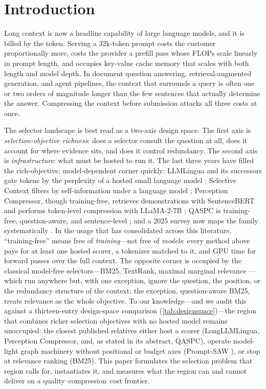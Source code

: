 \documentclass[preprint,12pt]{elsarticle}
\theoremstyle{remark}
\begin{document}
\section{Introduction}
\label{sec:intro}

Long context is now a headline capability of large language models, and
it is billed by the token. Serving a 32k-token prompt costs the customer
proportionally more, costs the provider a prefill pass whose FLOPs scale
linearly in prompt length, and occupies key-value cache memory that
scales with both length and model depth. In document question
answering, retrieval-augmented generation, and agent pipelines, the
context that surrounds a query is often one or two orders of magnitude
longer than the few sentences that actually determine the answer.
Compressing the context before submission attacks all three costs at
once.

The selector landscape is best read as a two-axis design space. The
first axis is \emph{selection-objective richness}: does a selector
consult the question at all, does it account for where evidence sits,
and does it control redundancy. The second axis is
\emph{infrastructure}: what must be hosted to run it. The last three
years have filled the rich-objective, model-dependent corner quickly:
LLMLingua and its successors gate tokens by the perplexity of a hosted
small language model
\citep{jiang2023llmlingua,jiang2023longllmlingua,pan2024llmlingua2};
Selective Context filters by self-information under a language model
\citep{li2023selective}; Perception Compressor, though training-free,
retrieves demonstrations with SentenceBERT and performs token-level
compression with LLaMA-2-7B \citep{tang2025perception}; QASPC is
training-free, question-aware, and sentence-level \citep{chen2025qaspc};
and a 2025 survey now maps the family systematically
\citep{li2025survey}. In the usage that has consolidated across this
literature, ``training-free'' means free of \emph{training}---not free
of \emph{models}: every method above pays for at least one hosted
scorer, a tokenizer matched to it, and GPU time for forward passes over
the full context. The opposite corner is occupied by the classical
model-free selectors---BM25, TextRank, maximal marginal relevance
\citep{robertson2009bm25,mihalcea2004textrank,carbonell1998mmr}---which
run anywhere but, with one exception, ignore the question, the
position, or the redundancy structure of the context; the exception,
question-aware BM25, treats relevance as the whole objective. To our
knowledge---and we audit this against a thirteen-entry design-space
comparison (\autoref{tab:designspace})---the region that combines richer
selection objectives with no hosted model remains unoccupied: the
closest published relatives either host a scorer (LongLLMLingua,
Perception Compressor, and, as stated in its abstract, QASPC), operate
model-light graph machinery without positional or budget axes
(Prompt-SAW \citep{ali2024promptsaw}), or stop at relevance ranking
(BM25). This paper formulates the selection problem that region calls
for, instantiates it, and measures what the region can and cannot
deliver on a quality--compression--cost frontier.
\end{document}
